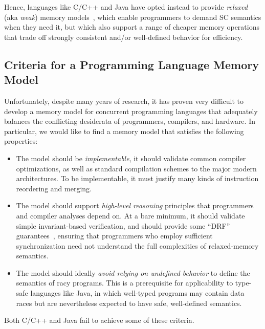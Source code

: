 Hence, languages like C/C++ and Java have opted instead to provide
\emph{relaxed} (aka \emph{weak}) memory models~\cite{jmm,cppstandard},
which enable programmers to demand SC semantics when they need it, but
which also support a range of cheaper memory operations that trade off
strongly consistent and/or well-defined behavior for efficiency.

\subsection{Criteria for a Programming Language Memory Model}
\label{sec:criteria}

Unfortunately, despite many years of research, it has proven very
difficult to develop a memory model for concurrent programming
languages that adequately balances the conflicting desiderata of
programmers, compilers, and hardware.  In particular, we would like to
find a memory model that satisfies the following properties:
\vspace{-.5ex}
\begin{itemize}
\item The model should be \emph{implementable}, \ie it should validate
  common compiler optimizations, as well as standard compilation
  schemes to the major modern architectures.  To be implementable, it
  must justify many kinds of instruction reordering and merging.\\[-2.5ex]
\item The model should support \emph{high-level reasoning} principles
  that programmers and compiler analyses depend on.  At a bare
  minimum, it should validate simple invariant-based verification, and
  should provide some ``DRF'' guarantees~\cite{Adve:1990}, ensuring that
  programmers who employ sufficient synchronization need not understand
  the full complexities of relaxed-memory semantics.\\[-2.5ex]
\item The model should ideally \emph{avoid relying on undefined
    behavior} to define the semantics of racy programs.  This is a
  prerequisite for applicability to type-safe languages like Java, in
  which well-typed programs may contain data races but are
  nevertheless expected to have safe, well-defined semantics.
\end{itemize}
\vspace{-.5ex}
\mbox{}\indent Both C/C++ and Java fail to achieve some of these criteria.

